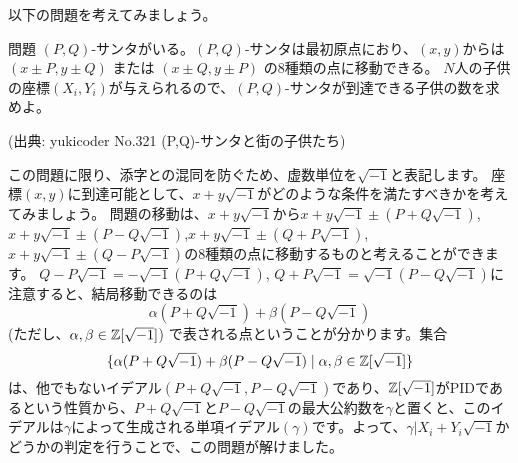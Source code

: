 \documentclass{jsarticle}
\begin{document}
 以下の問題を考えてみましょう。
 \begin{itembox}[l]{問題}
  $(P, Q)$-サンタがいる。$(P, Q)$-サンタは最初原点におり、$(x, y)$からは$(x \pm P, y \pm Q)$ または $(x \pm Q, y\pm P)$ の8種類の点に移動できる。
  $N$人の子供の座標$(X_i,Y_i)$が与えられるので、$(P, Q)$-サンタが到達できる子供の数を求めよ。

  (出典: yukicoder No.321 (P,Q)-サンタと街の子供たち)
 \end{itembox}
 この問題に限り、添字との混同を防ぐため、虚数単位を$\sqrt{-1}$と表記します。
 座標$(x,y)$に到達可能として、$x+y\sqrt{-1}$がどのような条件を満たすべきかを考えてみましょう。
 問題の移動は、$x+y\sqrt{-1}$から$x+y\sqrt{-1}\pm (P+Q\sqrt{-1})$,$x+y\sqrt{-1}\pm (P-Q\sqrt{-1})$,$x+y\sqrt{-1}\pm (Q+P\sqrt{-1})$,$x+y\sqrt{-1}\pm (Q-P\sqrt{-1})$の8種類の点に移動するものと考えることができます。
 $Q-P\sqrt{-1}=-\sqrt{-1}(P+Q\sqrt{-1})$, $Q+P\sqrt{-1}=\sqrt{-1}(P-Q\sqrt{-1})$に注意すると、結局移動できるのは
 \begin{displaymath}
  \alpha(P+Q\sqrt{-1}) + \beta(P-Q\sqrt{-1})
 \end{displaymath}
 (ただし、$\alpha,\beta \in \mathbb{Z}[\sqrt{-1}]$) で表される点ということが分かります。集合
 \begin{displaymath}
  \{\alpha(P+Q\sqrt{-1}) + \beta(P-Q\sqrt{-1}) \mid \alpha,\beta \in \mathbb{Z}[\sqrt{-1}]\}
 \end{displaymath}
 は、他でもないイデアル$(P+Q\sqrt{-1},P-Q\sqrt{-1})$であり、$\mathbb{Z}[\sqrt{-1}]$がPIDであるという性質から、$P+Q\sqrt{-1}$と$P-Q\sqrt{-1}$の最大公約数を$\gamma$と置くと、このイデアルは$\gamma$によって生成される単項イデアル$(\gamma)$です。よって、$\gamma | X_i+Y_i\sqrt{-1}$かどうかの判定を行うことで、この問題が解けました。
\end{document}
